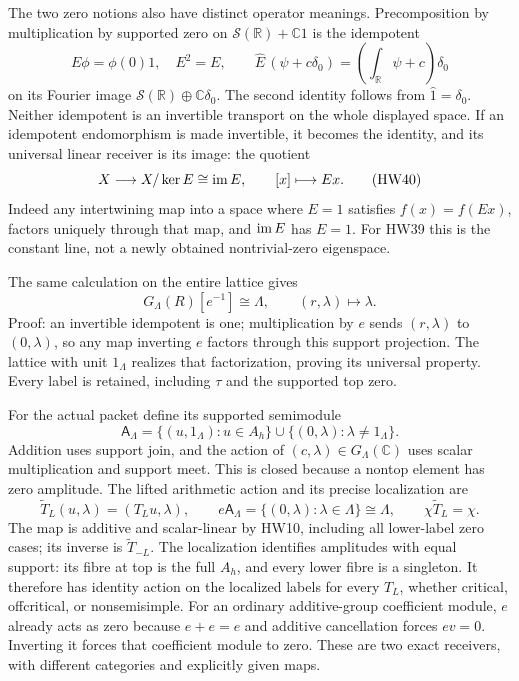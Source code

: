 \documentclass[11pt,a4paper]{article}
\theoremstyle{definition}\newtheorem{definition}[theorem]{Definition}
\newcommand{\C}{\mathbb C}\newcommand{\R}{\mathbb R}
\begin{document}
The two zero notions also have distinct operator meanings.
Precomposition by multiplication by supported zero on
\(\mathcal S(\R)+\C1\) is the idempotent
\[
 E\phi=\phi(0)1,\quad E^2=E,\qquad
 \widehat E\,(\psi+c\delta_0)
       =\left(\int_\R\psi+c\right)\delta_0
 \tag{HW39}
\]
on its Fourier image \(\mathcal S(\R)\oplus\C\delta_0\).
The second identity follows from \(\widehat1=\delta_0\).
Neither idempotent is an invertible transport on the whole
displayed space. If an idempotent endomorphism is made
invertible, it becomes the identity, and its universal linear
receiver is its image: the quotient
\[
 X\longrightarrow X/\ker E\cong\operatorname{im} E,\qquad [x]\longmapsto Ex .
 \tag{HW40}
\]
Indeed any intertwining map into a space where \(E=1\)
satisfies \(f(x)=f(Ex)\), factors uniquely through that map,
and \(\operatorname{im} E\) has \(E=1\). For HW39 this is the constant
line, not a newly obtained nontrivial-zero eigenspace.

The same calculation on the entire lattice gives
\[
 G_\Lambda(R)[e^{-1}]\cong\Lambda,\qquad
 (r,\lambda)\longmapsto\lambda .
 \tag{HW41}\label{hw:localization}
\]
Proof: an invertible idempotent is one; multiplication by
\(e\) sends \((r,\lambda)\) to \((0,\lambda)\), so any map
inverting \(e\) factors through this support projection.
The lattice with unit \(1_\Lambda\) realizes that factorization,
proving its universal property. Every label is retained,
including \(\tau\) and the supported top zero.

For the actual packet define its supported semimodule
\[
 \mathsf A_\Lambda
 =\{(u,1_\Lambda):u\in A_h\}
          \cup\{(0,\lambda):\lambda\ne1_\Lambda\}.
 \tag{HW42}
\]
Addition uses support join, and the action of
\((c,\lambda)\in G_\Lambda(\C)\) uses scalar multiplication
and support meet. This is closed because a nontop element
has zero amplitude. The lifted arithmetic action and its
precise localization are
\[
 \widetilde T_L(u,\lambda)=(T_Lu,\lambda),\qquad
 e\mathsf A_\Lambda=\{(0,\lambda):\lambda\in\Lambda\}
       \cong\Lambda,\qquad
 \chi\widetilde T_L=\chi.
 \tag{HW43}
\]
The map is additive and scalar-linear by HW10, including
all lower-label zero cases; its inverse is \(\widetilde T_{-L}\).
The localization identifies amplitudes with equal support:
its fibre at top is the full \(A_h\), and every lower fibre
is a singleton. It therefore has identity action on the
localized labels for every \(T_L\), whether critical,
offcritical, or nonsemisimple.
For an ordinary additive-group coefficient module, \(e\)
already acts as zero because \(e+e=e\) and additive
cancellation forces \(ev=0\). Inverting it forces that
coefficient module to zero. These are two exact receivers,
with different categories and explicitly given maps.
\end{document}
